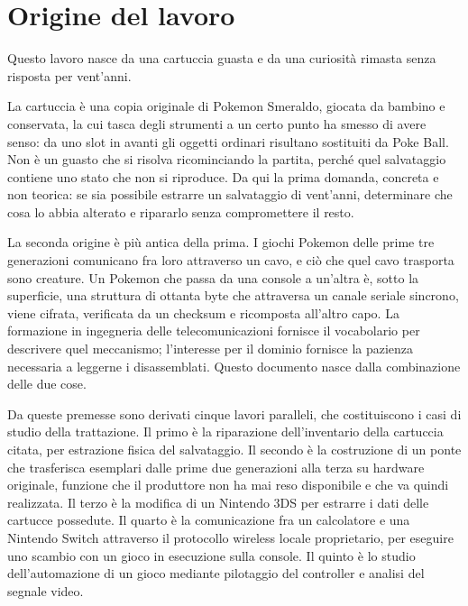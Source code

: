 
\section*{Origine del lavoro}

Questo lavoro nasce da una cartuccia guasta e da una curiosità rimasta senza risposta per
vent'anni.

La cartuccia è una copia originale di Pokemon Smeraldo, giocata da bambino e conservata,
la cui tasca degli strumenti a un certo punto ha smesso di avere senso: da uno slot in
avanti gli oggetti ordinari risultano sostituiti da Poke Ball. Non è un guasto che si
risolva ricominciando la partita, perché quel salvataggio contiene uno stato che non si
riproduce. Da qui la prima domanda, concreta e non teorica: se sia possibile estrarre un
salvataggio di vent'anni, determinare che cosa lo abbia alterato e ripararlo senza
compromettere il resto.

La seconda origine è più antica della prima. I giochi Pokemon delle prime tre generazioni
comunicano fra loro attraverso un cavo, e ciò che quel cavo trasporta sono creature. Un
Pokemon che passa da una console a un'altra è, sotto la superficie, una struttura di
ottanta byte che attraversa un canale seriale sincrono, viene cifrata, verificata da un
checksum e ricomposta all'altro capo. La formazione in ingegneria delle telecomunicazioni
fornisce il vocabolario per descrivere quel meccanismo; l'interesse per il dominio fornisce
la pazienza necessaria a leggerne i disassemblati. Questo documento nasce dalla
combinazione delle due cose.

Da queste premesse sono derivati cinque lavori paralleli, che costituiscono i casi di
studio della trattazione. Il primo è la riparazione dell'inventario della cartuccia
citata, per estrazione fisica del salvataggio. Il secondo è la costruzione di un ponte che
trasferisca esemplari dalle prime due generazioni alla terza su hardware originale,
funzione che il produttore non ha mai reso disponibile e che va quindi realizzata. Il terzo
è la modifica di un Nintendo 3DS per estrarre i dati delle cartucce possedute. Il quarto è
la comunicazione fra un calcolatore e una Nintendo Switch attraverso il protocollo
wireless locale proprietario, per eseguire uno scambio con un gioco in esecuzione sulla
console. Il quinto è lo studio dell'automazione di un gioco mediante pilotaggio del
controller e analisi del segnale video.

